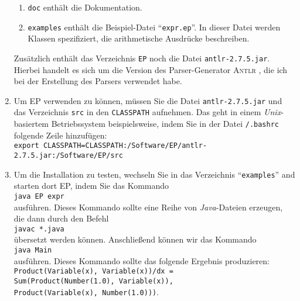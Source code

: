 \begin{enumerate}
\begin{enumerate}
      \item \texttt{doc} enth\"alt die Dokumentation.
      \item \texttt{examples} enth\"alt die Beispiel-Datei ``\texttt{expr.ep}''.
            In dieser Datei werden Klassen spezifiziert, die arithmetische Ausdr\"ucke beschreiben.
      \end{enumerate}
      Zus\"atzlich enth\"alt das Verzeichnis \texttt{EP} noch die Datei \texttt{antlr-2.7.5.jar}.
      Hierbei handelt es sich um die Version des Parser-Generator \textsc{Antlr}
      \cite{parr95antlr},
      die ich bei der Erstellung des Parsers verwendet habe.
\item Um EP verwenden zu k\"onnen, m\"ussen Sie die Datei \texttt{antlr-2.7.5.jar} und das
      Verzeichnis \texttt{src} in den \texttt{CLASSPATH} aufnehmen.  Das geht in einem
      \textsl{Unix}-basiertem Betriebssystem beispielsweise,
      indem Sie in der Datei \texttt{/.bashrc} folgende Zeile hinzuf\"ugen:
      \\[0.2cm]
      \texttt{export
        CLASSPATH=CLASSPATH:/Software/EP/antlr-2.7.5.jar:/Software/EP/src} 
\item Um die Installation zu testen, wechseln Sie in das Verzeichnis ``\texttt{examples}'' and
      starten dort EP, indem Sie das Kommando 
      \\[0.2cm]
      \hspace*{1.3cm} \texttt{java EP expr} 
      \\[0.2cm]
      ausf\"uhren.  
      Dieses Kommando sollte eine Reihe von \textsl{Java}-Dateien erzeugen, die dann durch den Befehl
      \\[0.2cm]
      \hspace*{1.3cm} \texttt{javac *.java} \\[0.2cm]
      \"ubersetzt werden k\"onnen.
      Anschlie{\ss}end k\"onnen wir das Kommando \\[0.2cm]
      \hspace*{1.3cm} \texttt{java Main} \\[0.2cm]
      ausf\"uhren.  Dieses Kommando sollte das folgende Ergebnis produzieren: \\[0.2cm]
      \hspace*{1.3cm} \texttt{Product(Variable(x), Variable(x))/dx = } \\
      \hspace*{2.3cm} \texttt{Sum(Product(Number(1.0), Variable(x)),} \\
      \hspace*{3.04cm}     \texttt{Product(Variable(x), Number(1.0)))}. 
\end{enumerate}

